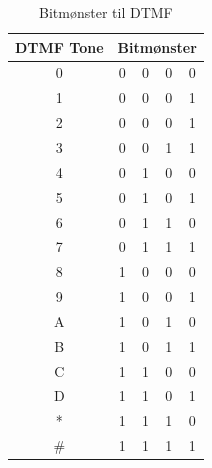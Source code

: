 \begin{table}[]
\centering
\caption{Bitmønster til DTMF}
\label{DTMFBitTabel}
\begin{tabular}{|c| c c c c|}
\hline
\multicolumn{1}{|l|}{DTMF Tone} & \multicolumn{4}{l|}{Bitmønster}                                                                   \\ \hline
0 								& 0						 & 0					  & 0
& 0						 \\ \hline
1 								& 0						 & 0					  & 0
& 1						 \\ \hline
2								& 0						 & 0					  & 0
& 1						 \\ \hline
3                               & 0                      & 0                      & 1                      & 1                      \\ \hline
4                               & 0                      & 1                      & 0                      & 0                      \\ \hline
5                               & 0                      & 1                      & 0                      & 1                      \\ \hline
6                               & 0                      & 1                      & 1                      & 0                      \\ \hline
7                               & 0                      & 1                      & 1                      & 1                      \\ \hline
8                               & 1                      & 0                      & 0                      & 0                      \\ \hline
9                               & 1                      & 0                      & 0                      & 1                      \\ \hline
A                               & 1                      & 0                      & 1                      & 0                      \\ \hline
B                               & 1                      & 0                      & 1                      & 1                      \\ \hline
C                               & 1                      & 1                      & 0                      & 0                      \\ \hline
D                               & 1                      & 1                      & 0                      & 1                      \\ \hline
*                               & 1                      & 1                      & 1                      & 0                      \\ \hline
\#                              & 1                      & 1                      & 1                      & 1                      \\ \hline
\end{tabular}
\end{table}

